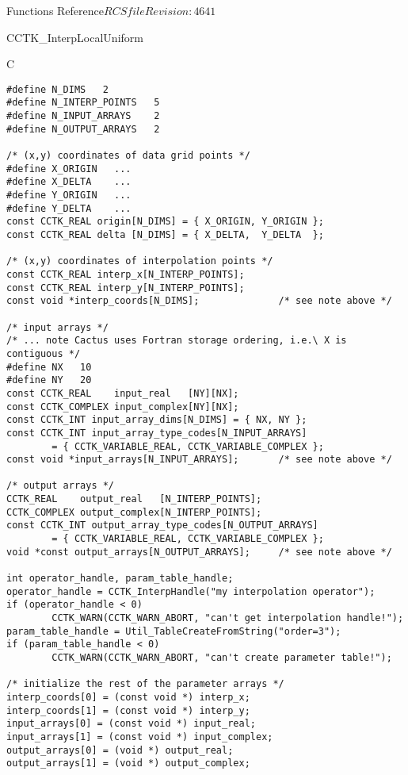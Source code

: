 \begin{cactuspart}{ Functions Reference}{$RCSfile$}{$Revision: 4641 $}
\begin{FunctionDescription}{CCTK\_InterpLocalUniform}
\begin{ExampleSection}
\begin{Example}{C}
\begin{verbatim}
#define N_DIMS   2
#define N_INTERP_POINTS   5
#define N_INPUT_ARRAYS    2
#define N_OUTPUT_ARRAYS   2

/* (x,y) coordinates of data grid points */
#define X_ORIGIN   ...
#define X_DELTA    ...
#define Y_ORIGIN   ...
#define Y_DELTA    ...
const CCTK_REAL origin[N_DIMS] = { X_ORIGIN, Y_ORIGIN };
const CCTK_REAL delta [N_DIMS] = { X_DELTA,  Y_DELTA  };

/* (x,y) coordinates of interpolation points */
const CCTK_REAL interp_x[N_INTERP_POINTS];
const CCTK_REAL interp_y[N_INTERP_POINTS];
const void *interp_coords[N_DIMS];              /* see note above */

/* input arrays */
/* ... note Cactus uses Fortran storage ordering, i.e.\ X is contiguous */
#define NX   10
#define NY   20
const CCTK_REAL    input_real   [NY][NX];
const CCTK_COMPLEX input_complex[NY][NX];
const CCTK_INT input_array_dims[N_DIMS] = { NX, NY };
const CCTK_INT input_array_type_codes[N_INPUT_ARRAYS]
        = { CCTK_VARIABLE_REAL, CCTK_VARIABLE_COMPLEX };
const void *input_arrays[N_INPUT_ARRAYS];       /* see note above */

/* output arrays */
CCTK_REAL    output_real   [N_INTERP_POINTS];
CCTK_COMPLEX output_complex[N_INTERP_POINTS];
const CCTK_INT output_array_type_codes[N_OUTPUT_ARRAYS]
        = { CCTK_VARIABLE_REAL, CCTK_VARIABLE_COMPLEX };
void *const output_arrays[N_OUTPUT_ARRAYS];     /* see note above */

int operator_handle, param_table_handle;
operator_handle = CCTK_InterpHandle("my interpolation operator");
if (operator_handle < 0)
        CCTK_WARN(CCTK_WARN_ABORT, "can't get interpolation handle!");
param_table_handle = Util_TableCreateFromString("order=3");
if (param_table_handle < 0)
        CCTK_WARN(CCTK_WARN_ABORT, "can't create parameter table!");

/* initialize the rest of the parameter arrays */
interp_coords[0] = (const void *) interp_x;
interp_coords[1] = (const void *) interp_y;
input_arrays[0] = (const void *) input_real;
input_arrays[1] = (const void *) input_complex;
output_arrays[0] = (void *) output_real;
output_arrays[1] = (void *) output_complex;


\end{verbatim}
\end{Example}
\end{ExampleSection}
\end{FunctionDescription}
\end{cactuspart}
